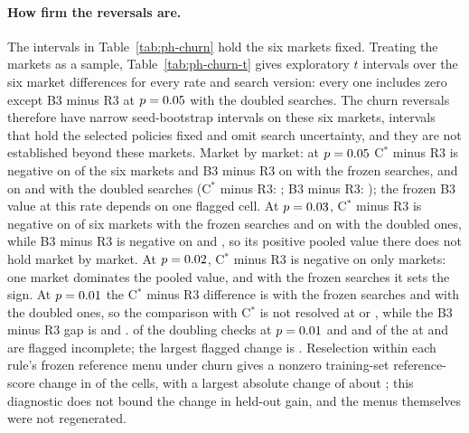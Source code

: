 \documentclass[11pt]{article}
\begin{document}
\paragraph{How firm the reversals are.} The intervals in Table~\ref{tab:ph-churn} hold the six markets fixed. Treating the markets as a sample, Table~\ref{tab:ph-churn-t} gives exploratory $t$ intervals over the six market differences for every rate and search version: every one includes zero except B3 minus R3 at $p = 0.05$ with the doubled searches. The churn reversals therefore have narrow seed-bootstrap intervals on these six markets, intervals that hold the selected policies fixed and omit search uncertainty, and they are not established beyond these markets. Market by market: at $p = 0.05$ C$^*$ minus R3 is negative on  of the six markets and B3 minus R3 on  with the frozen searches, and on  and  with the doubled searches (C$^*$ minus R3: ; B3 minus R3: ); the frozen B3 value at this rate depends on one flagged cell. At $p = 0.03$, C$^*$ minus R3 is negative on  of six markets with the frozen searches and on  with the doubled ones, while B3 minus R3 is negative on  and , so its positive pooled value there does not hold market by market. At $p = 0.02$, C$^*$ minus R3 is negative on only  markets: one market dominates the pooled value, and with the frozen searches it sets the sign. At $p = 0.01$ the C$^*$ minus R3 difference is  with the frozen searches and  with the doubled ones, so the comparison with C$^*$ is not resolved at  or , while the B3 minus R3 gap is  and .  of the  doubling checks at $p = 0.01$ and  and  of the  at  and  are flagged incomplete; the largest flagged change is . Reselection within each rule's frozen reference menu under churn gives a nonzero training-set reference-score change in  of the  cells, with a largest absolute change of about ; this diagnostic does not bound the change in held-out gain, and the menus themselves were not regenerated.
\end{document}
